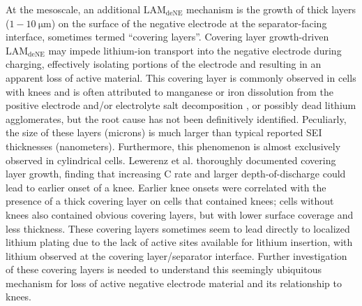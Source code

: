 \documentclass[journal=jpclcd,manuscript=article]{achemso}
\begin{document}
At the mesoscale, an additional $\mathrm{LAM_{deNE}}$ mechanism is the growth of thick layers ($1 - 10\: \mathrm{\mu m}$) on the surface of the negative electrode at the separator-facing interface, sometimes termed ``covering layers''\cite{lewerenz_post-mortem_2017, lewerenz_systematic_2017, willenberg_development_2020}.
Covering layer growth-driven $\mathrm{LAM_{deNE}}$ may impede lithium-ion transport into the negative electrode during charging, effectively isolating portions of the electrode and resulting in an apparent loss of active material. This covering layer is commonly observed in cells with knees and is often attributed to manganese or iron dissolution from the positive electrode and/or electrolyte salt decomposition \cite{lewerenz_post-mortem_2017,lewerenz_systematic_2017,zhu_investigation_2021,stiaszny_electrochemical_2014,rahe_nanoscale_2019,keil_linear_2019,sarasketa-zabala_understanding_2015, li_degradation_2016, klett_non-uniform_2014, klett_uneven_2015, willenberg_high-precision_2020, wang_cycle-life_2011, fang_capacity_2021}{}, or possibly dead lithium agglomerates\cite{schindler_fast_2018}{}, but the root cause has not been definitively identified. Peculiarly, the size of these layers (microns) is much larger than typical reported SEI thicknesses (nanometers)\cite{peled_reviewsei_2017}. Furthermore, this phenomenon is almost exclusively observed in cylindrical cells.
Lewerenz et al.\cite{lewerenz_post-mortem_2017,lewerenz_systematic_2017} thoroughly documented covering layer growth, finding that increasing C rate and larger depth-of-discharge could lead to earlier onset of a knee. Earlier knee onsets were correlated with the presence of a thick covering layer on cells that contained knees; cells without knees also contained obvious covering layers, but with lower surface coverage and less thickness. These covering layers sometimes seem to lead directly to localized lithium plating due to the lack of active sites available for lithium insertion, with lithium observed at the covering layer/separator interface.\cite{zhu_investigation_2021}
Further investigation of these covering layers is needed to understand this seemingly ubiquitous mechanism for loss of active negative electrode material and its relationship to knees.
\end{document}

